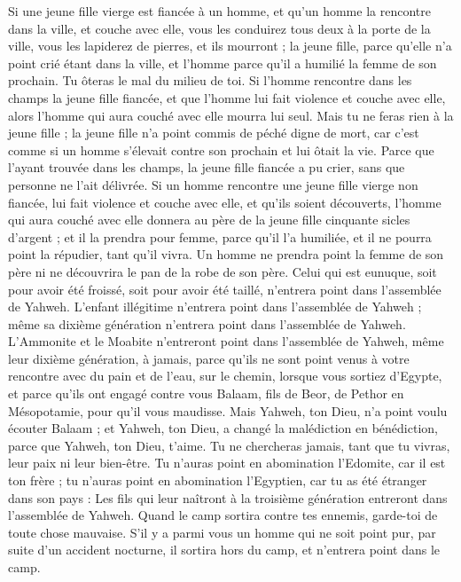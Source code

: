 \begin{multicols}{2}
Si une jeune fille vierge est fiancée à un homme, et qu’un homme la rencontre dans la ville, et couche avec elle,
vous les conduirez tous deux à la porte de la ville, vous les lapiderez de pierres, et ils mourront ; la jeune fille, parce qu'elle n’a point crié étant dans la ville, et l'homme parce qu'il a humilié la femme de son prochain. Tu ôteras le mal du milieu de toi.
Si l’homme rencontre dans les champs la jeune fille fiancée, et que l’homme lui fait violence et couche avec elle, alors l'homme qui aura couché avec elle mourra lui seul.
Mais tu ne feras rien à la jeune fille ; la jeune fille n'a point commis de péché digne de mort, car c’est comme si un homme s'élevait contre son prochain et lui ôtait la vie.
Parce que l'ayant trouvée dans les champs, la jeune fille fiancée a pu crier, sans que personne ne l’ait délivrée.
Si un homme rencontre une jeune fille vierge non fiancée, lui fait violence et couche avec elle, et qu'ils soient découverts,
l'homme qui aura couché avec elle donnera au père de la jeune fille cinquante sicles d'argent ; et il la prendra pour femme, parce qu'il l'a humiliée, et il ne pourra point la répudier, tant qu'il vivra.
Un homme ne prendra point la femme de son père ni ne découvrira le pan de la robe de son père.
\VerseOne{}Celui qui est eunuque, soit pour avoir été froissé, soit pour avoir été taillé, n'entrera point dans l'assemblée de Yahweh.
L’enfant illégitime n'entrera point dans l'assemblée de Yahweh ; même sa dixième génération n'entrera point dans l'assemblée de Yahweh.
L’Ammonite et le Moabite n'entreront point dans l'assemblée de Yahweh, même leur dixième génération, à jamais,
parce qu'ils ne sont point venus à votre rencontre avec du pain et de l'eau, sur le chemin, lorsque vous sortiez d'Egypte, et parce qu'ils ont engagé contre vous Balaam, fils de Beor, de Pethor en Mésopotamie, pour qu’il vous maudisse.
Mais Yahweh, ton Dieu, n’a point voulu écouter Balaam ; et Yahweh, ton Dieu, a changé la malédiction en bénédiction, parce que Yahweh, ton Dieu, t'aime.
Tu ne chercheras jamais, tant que tu vivras, leur paix ni leur bien-être.
Tu n'auras point en abomination l'Edomite, car il est ton frère ; tu n'auras point en abomination l'Egyptien, car tu as été étranger dans son pays :
Les fils qui leur naîtront à la troisième génération entreront dans l'assemblée de Yahweh.
Quand le camp sortira contre tes ennemis, garde-toi de toute chose mauvaise.
S'il y a parmi vous un homme qui ne soit point pur, par suite d’un accident nocturne, il sortira hors du camp, et n'entrera point dans le camp.

\end{multicols}
